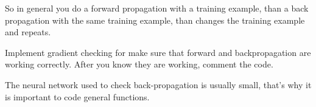 \documentclass[12pt,a4paper]{report}
\begin{document}
	So in general you do a forward propagation with a training example, than a back propagation with the same training example, than changes the training example and repeats.
	
	Implement gradient checking for make sure that forward and backpropagation are working correctly. After you know they are working, comment the code.
	
	The neural network used to check back-propagation is usually small, that's why it is important to code general functions.
	
	
	
	
\end{document}
